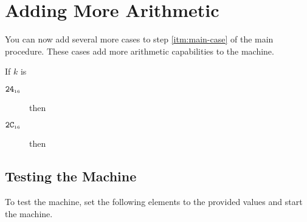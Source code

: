 \documentclass[a4paper,12pt]{article}
\newcommand{\num}[1]{\texttt{#1}}
\newcommand{\hex}[1]{\num{#1}_{\textup{\tiny 16}}}
\newcommand{\proc}[1]{\textsc{#1}}
\newcommand{\op}[1]{$#1$}
\newcommand{\LT}        [1]{\op{\hex{24}}}
\newcommand{\POW}       [1]{\op{\hex{2C}}}
\begin{document}
\section{Adding More Arithmetic}

You can now add several more cases to step \ref{itm:main-case} of the main procedure.
These cases add more arithmetic capabilities to the machine.

\begin{stepnumbers}[start=3]
\item If $k$ is
  \begin{description}
  \item[\LT{}] then
  \item[\POW{}] then
  \end{description}
\end{stepnumbers}

\subsection{Testing the Machine}

To test the machine, set the following elements to the provided values and start the machine.
\end{document}
